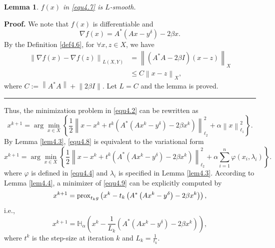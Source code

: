 \documentclass[a4paper,12pt]{article}
\newtheorem{lemma}[theorem]{Lemma}
\numberwithin{equation}{section}
\newenvironment{proof}[1][Proof]{\textbf{#1.} }
{\ \rule{0.75em}{0.75em}\smallskip}
\begin{document}
\begin{lemma}\label{lem4.7}
    $f\left(x\right)$ in \eqref{equ4.7} is $L$-smooth.
\end{lemma}
\begin{proof}
    We note that $f\left(x\right)$ is differentiable and
    \begin{equation*}
        \nabla f\left(x\right)=A^{*}\left(Ax-y^{\delta}\right)-2\beta x.
    \end{equation*}
    By the Definition \ref{def4.6}, for $\forall x,z\in X$, we have
    \begin{align*}
        \left\|\nabla f\left(x\right)-\nabla f\left(z\right)\right\|_{L\left(X,Y\right)}
        & =\left\|\left(A^{*}A-2\beta I\right)\left(x-z\right)\right\|_{X} \nonumber\\
        & \leq C\left\|x-z\right\|_{X},
    \end{align*}
    where $C:=\left\|A^{*}A\right\|+\left\|2\beta I\right\|$. Let $L=C$ and the lemma is proved.
\end{proof}

\par Thus, the minimization problem in \eqref{equ4.2} can be rewritten as
\begin{equation}\label{equ4.8}
    x^{k+1}=\arg\min_{x\in X}\left\{\frac{1}{2}\left\|x-x^{k}+t^{k}\left(A^{*} \left(Ax^{k}-y^{\delta}\right)-2\beta x^{k}\right)\right\|_{\ell_{2}}^{2}+ \alpha\left\|x\right\|_{\ell_{1}}^{2}\right\}.
\end{equation}
By Lemma \ref{lem4.3}, \eqref{equ4.8} is equivalent to the variational form
\begin{equation}\label{equ4.9}
    x^{k+1}=\arg\min_{x\in X}\left\{\frac{1}{2}\left\|x-x^{k}+t^{k}\left(A^{*} \left(Ax^{k}-y^{\delta}\right)-2\beta x^{k}\right)\right\|_{\ell_{2}}^{2}+ \alpha\sum_{i=1}^{n}\varphi\left(x_{i},\lambda_{i}\right)\right\}.
\end{equation}
where $\varphi$ is defined in \eqref{equ4.4} and $\lambda_{i}$ is specified in Lemma \ref{lem4.3}. According to Lemma \ref{lem4.4}, a minimizer of \eqref{equ4.9} can be explicitly computed by
\begin{equation*}
    x^{k+1}={\rm prox}_{t_{k}g}\left(x^{k}-t_{k}\left(A^{*} \left(Ax^{k}-y^{\delta}\right)-2\beta x^{k}\right)\right), 
\end{equation*}
i.e.,
\begin{equation*}
    x^{k+1}=\mathbb{H}_{\alpha}\left(x^{k}-\frac{1}{L_{k}} \left(A^{*}\left(Ax^{k}-y^{\delta}\right)-2\beta x^{k}\right)\right), 
\end{equation*}
where $t^{k}$ is the step-size at iteration $k$ and $L_{k}=\frac{1}{t_{k}}$.
\end{document}
